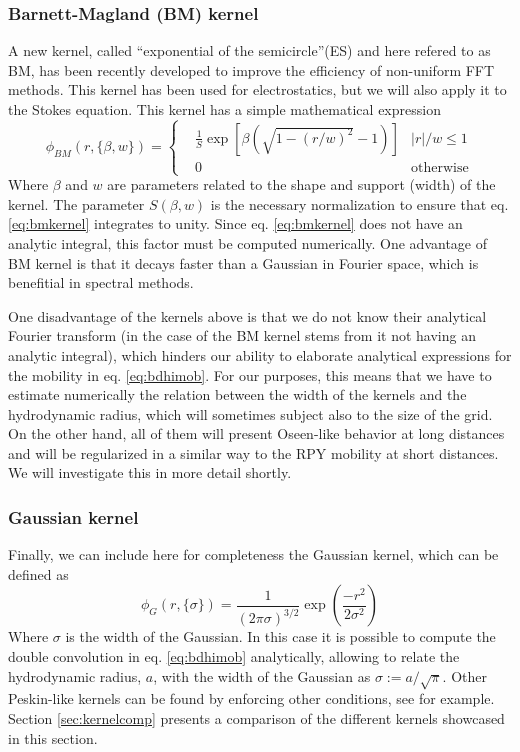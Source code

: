 \documentclass[ twoside,openright,titlepage,numbers=noenddot,%
headinclude,footinclude,cleardoublepage=empty,abstract=on,
BCOR=5mm,paper=a4,fontsize=11pt, dvipsnames
]{scrreprt}
\begin{document}
\subsubsection*{Barnett-Magland (BM) kernel}
A new kernel, called ``exponential of the semicircle''(ES) and here refered to as BM, has been recently developed to improve the efficiency of non-uniform \gls{FFT} methods\cite{Barnett2019}. This kernel has been used for electrostatics\cite{Shamshirgar2021}, but we will also apply it to the Stokes equation. This kernel has a simple mathematical expression
\begin{equation}
  \label{eq:bmkernel}
  \phi_{BM}(r,\{\beta, w\}) = \left\{
  \begin{aligned}
    &\frac{1}{S}\exp\left[\beta(\sqrt{1-(r/w)^2}-1)\right] & |r|/w\le 1\\
    & 0 & \textrm{otherwise}
  \end{aligned}\right.
\end{equation}
Where $\beta$ and $w$ are parameters related to the shape and support (width) of the kernel. The parameter $S(\beta, w)$ is the necessary normalization to ensure that eq. \eqref{eq:bmkernel} integrates to unity. Since eq. \eqref{eq:bmkernel} does not have an analytic integral, this factor must be computed numerically. One advantage of BM kernel is that it decays faster than a Gaussian in Fourier space, which is benefitial in spectral methods\cite{Barnett2019}.

One disadvantage of the kernels above is that we do not know their analytical Fourier transform (in the case of the BM kernel stems from it not having an analytic integral), which hinders our ability to elaborate analytical expressions for the mobility in eq. \eqref{eq:bdhimob}.
For our purposes, this means that we have to estimate numerically the relation between the width of the kernels and the hydrodynamic radius, which will sometimes subject also to the size of the grid.
On the other hand, all of them will present Oseen-like behavior at long distances and will be regularized in a similar way to the \gls{RPY} mobility at short distances.
We will investigate this in more detail shortly.
\subsubsection*{Gaussian kernel}
Finally, we can include here for completeness the Gaussian kernel, which can be defined as
\begin{equation}
  \label{eq:gaussiankernel}
  \phi_G(r,\{\sigma\}) = \frac{1}{(2\pi\sigma)^{3/2}}\exp\left(\frac{-r^2}{2\sigma^2}\right)
\end{equation}
Where $\sigma$ is the width of the Gaussian.
In this case it is possible to compute the double convolution in eq. \eqref{eq:bdhimob} analytically, allowing to relate the hydrodynamic radius, $a$, with the width of the Gaussian as $\sigma := a/\sqrt{\pi}$.
Other Peskin-like kernels can be found by enforcing other conditions, see for example\cite{Yang2009}.
Section \ref{sec:kernelcomp} presents a comparison of the different kernels showcased in this section.
\end{document}
